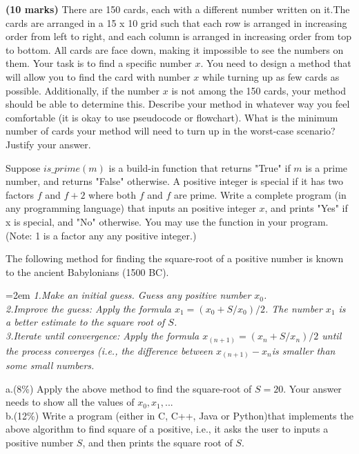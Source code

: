 \documentclass{article}
\begin{document}
\vspace{2\baselineskip} %

\noindent\textbf{(10 marks)} There are 150 cards, each with a different number written on it.The cards are arranged in a 15 x 10 grid such that each row is arranged in increasing order from left to right, and each column is arranged in increasing order from top to bottom. All cards are face down, making it impossible to see the numbers on them. Your task is to find a specific number $x$. You need to design a method that will allow you to find the card with number $x$ while turning up as few cards as possible. Additionally, if the number $x$ is not among the 150 cards, your method should be able to determine this. Describe your method in whatever way you feel comfortable (it is okay to use pseudocode or flowchart). What is the minimum number of cards your method will need to turn up in the worst-case scenario? Justify your answer.

\vspace{2\baselineskip}

\noindent Suppose $is\_prime(m)$ is a build-in function that returns "True" if $m$ is a prime number, and returns "False" otherwise.
A positive integer is special if it has two factors $f$ and $f+2$ where both $f$ and $f$ are prime. Write a complete program (in any programming language) that inputs an positive integer $x$, and prints "Yes" if x is special, and "No" otherwise. You may use the function  in your program. (Note: 1 is a factor any any positive integer.)

\vspace{5\baselineskip}


\noindent The following method for finding the square-root of a positive number is known to the ancient Babylonians (1500 BC).

\hangindent=2em %
\textit{1.Make an initial guess. Guess any positive number $x_0$.}\\
\textit{2.Improve the guess: Apply the formula $x_1 = (x_0+S/x_0) / 2$. The number $x_1$ is a better estimate to the square root of $S$.}\\
\textit{3.Iterate until convergence: Apply the formula $x_(n+1) = (x_n+S/x_n) / 2$ until the process converges (i.e., the difference between $x_(n+1)-x_n$is smaller than some small numbers.}

\noindent a.(8\%) Apply the above method to find the square-root of $S=20$. Your answer needs to show all the values of $x_0, x_1, ...$\\
\noindent b.(12\%) Write a program (either in C, C++, Java or Python)that implements the above algorithm to find square of a positive, i.e., it asks the user to inputs a positive number $S$, and then prints the square root of $S$.
\end{document}
